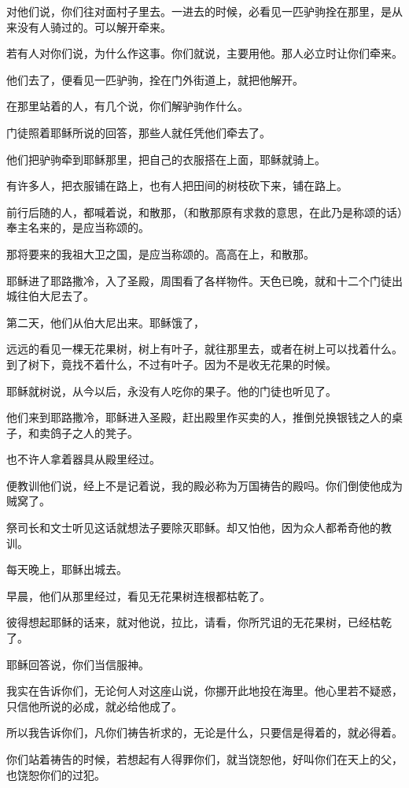 \documentclass[12pt,oneside]{book}
\begin{document}
对他们说，你们往对面村子里去。一进去的时候，必看见一匹驴驹拴在那里，是从来没有人骑过的。可以解开牵来。

若有人对你们说，为什么作这事。你们就说，主要用他。那人必立时让你们牵来。

他们去了，便看见一匹驴驹，拴在门外街道上，就把他解开。

在那里站着的人，有几个说，你们解驴驹作什么。

门徒照着耶稣所说的回答，那些人就任凭他们牵去了。

他们把驴驹牵到耶稣那里，把自己的衣服搭在上面，耶稣就骑上。

有许多人，把衣服铺在路上，也有人把田间的树枝砍下来，铺在路上。

前行后随的人，都喊着说，和散那，（和散那原有求救的意思，在此乃是称颂的话）奉主名来的，是应当称颂的。

那将要来的我祖大卫之国，是应当称颂的。高高在上，和散那。

耶稣进了耶路撒冷，入了圣殿，周围看了各样物件。天色已晚，就和十二个门徒出城往伯大尼去了。

第二天，他们从伯大尼出来。耶稣饿了，

远远的看见一棵无花果树，树上有叶子，就往那里去，或者在树上可以找着什么。到了树下，竟找不着什么，不过有叶子。因为不是收无花果的时候。

耶稣就树说，从今以后，永没有人吃你的果子。他的门徒也听见了。

他们来到耶路撒冷，耶稣进入圣殿，赶出殿里作买卖的人，推倒兑换银钱之人的桌子，和卖鸽子之人的凳子。

也不许人拿着器具从殿里经过。

便教训他们说，经上不是记着说，我的殿必称为万国祷告的殿吗。你们倒使他成为贼窝了。

祭司长和文士听见这话就想法子要除灭耶稣。却又怕他，因为众人都希奇他的教训。

每天晚上，耶稣出城去。

早晨，他们从那里经过，看见无花果树连根都枯乾了。

彼得想起耶稣的话来，就对他说，拉比，请看，你所咒诅的无花果树，已经枯乾了。

耶稣回答说，你们当信服神。

我实在告诉你们，无论何人对这座山说，你挪开此地投在海里。他心里若不疑惑，只信他所说的必成，就必给他成了。

所以我告诉你们，凡你们祷告祈求的，无论是什么，只要信是得着的，就必得着。

你们站着祷告的时候，若想起有人得罪你们，就当饶恕他，好叫你们在天上的父，也饶恕你们的过犯。
\end{document}

